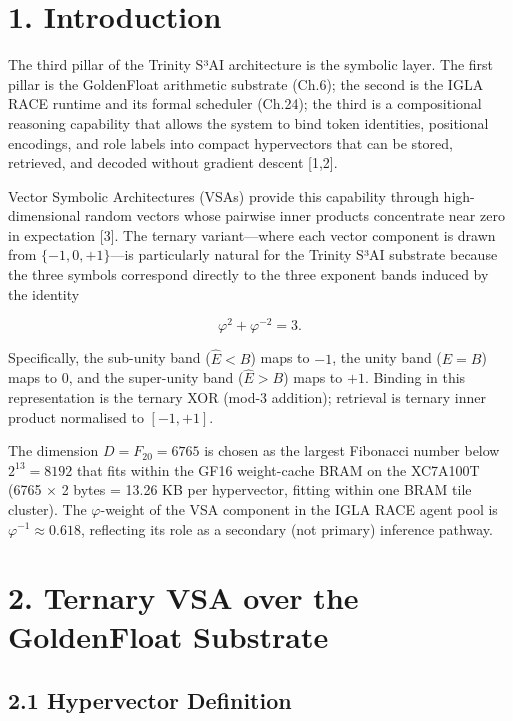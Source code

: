 \section{1. Introduction}\label{fa_30:introduction}

The third pillar of the Trinity S³AI architecture
is the symbolic layer. The first pillar is the
GoldenFloat arithmetic substrate (Ch.6); the
second is the IGLA RACE runtime and its formal
scheduler (Ch.24); the third is a compositional
reasoning capability that allows the system to
bind token identities, positional encodings, and
role labels into compact hypervectors that can be
stored, retrieved, and decoded without gradient
descent [1,2].

Vector Symbolic Architectures (VSAs) provide this
capability through high-dimensional random vectors
whose pairwise inner products concentrate near
zero in expectation [3]. The ternary
variant---where each vector component is drawn
from \(\{-1, 0, +1\}\)---is particularly natural
for the Trinity S³AI substrate because the three
symbols correspond directly to the three exponent
bands induced by the identity

\[\varphi^2 + \varphi^{-2} = 3.\]

Specifically, the sub-unity band (\(\hat E < B\))
maps to \(-1\), the unity band (\(\hat E = B\))
maps to \(0\), and the super-unity band
(\(\hat E > B\)) maps to \(+1\). Binding in this
representation is the ternary XOR (mod-3
addition); retrieval is ternary inner product
normalised to \([-1, +1]\).

The dimension \(D = F_{20} = 6765\) is chosen as
the largest Fibonacci number below
\(2^{13} = 8192\) that fits within the GF16
weight-cache BRAM on the XC7A100T (6765 $\times$ 2 bytes
= 13.26 KB per hypervector, fitting within one
BRAM tile cluster). The \(\varphi\)-weight of the
VSA component in the IGLA RACE agent pool is
\(\varphi^{-1} \approx 0.618\), reflecting its
role as a secondary (not primary) inference
pathway.

\section{2. Ternary VSA over the GoldenFloat
Substrate}\label{fa_30:ternary-vsa-over-the-goldenfloat-substrate}

\subsection{2.1 Hypervector
Definition}\label{fa_30:hypervector-definition}

